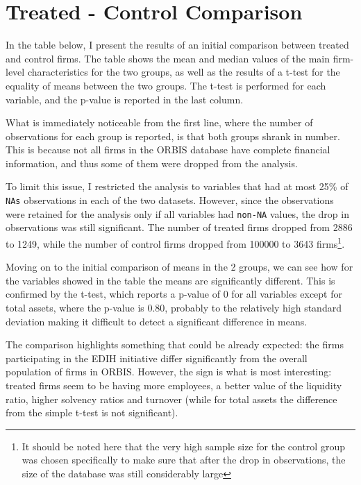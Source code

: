 \documentclass[12pt]{report}
\begin{document}
\section{Treated - Control Comparison}

\par In the table below, I present the results of an initial comparison between treated and control firms. The table shows the mean and median values of the main firm-level characteristics for the two groups, as well as the results of a t-test for the equality of means between the two groups. The t-test is performed for each variable, and the p-value is reported in the last column.



\par What is immediately noticeable from the first line, where the number of observations for each group is reported, is that both groups shrank in number. This is because not all firms in the ORBIS database have complete financial information, and thus some of them were dropped from the analysis. 
\par To limit this issue, I restricted the analysis to variables that had at most 25\% of \texttt{NAs} observations in each of the two datasets. However, since the observations were retained for the analysis only if all variables had \texttt{non-NA} values, the drop in observations was still significant. The number of treated firms dropped from 2886 to 1249, while the number of control firms dropped from 100000 to 3643 firms\footnote{It should be noted here that the very high sample size for the control group was chosen specifically to make sure that after the drop in observations, the size of the database was still considerably large}.

\par Moving on to the initial comparison of means in the 2 groups, we can see how for the variables showed in the table the means are significantly different. This is confirmed by the t-test, which reports a p-value of 0 for all variables except for total assets, where the p-value is 0.80, probably to the relatively high standard deviation making it difficult to detect a significant difference in means.
\par The comparison highlights something that could be already expected: the firms participating in the EDIH initiative differ significantly from the overall population of firms in ORBIS. However, the sign is what is most interesting: treated firms seem to be having more employees, a better value of the liquidity ratio, higher solvency ratios and turnover (while for total assets the difference from the simple t-test is not significant).
\end{document}
